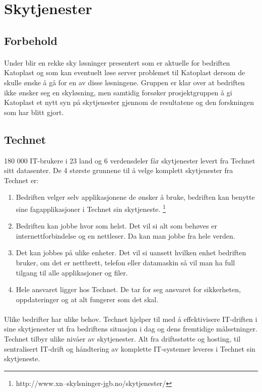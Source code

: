 \section{Skytjenester}
\subsection{Forbehold} 
\paragraph{} Under blir en rekke sky løsninger presentert som er aktuelle for bedriften Katoplast og som kan eventuelt løse server problemet til Katoplast dersom de skulle ønske å gå for en av disse løsningene. Gruppen er klar over at bedriften ikke ønsker seg en skyløsning, men samtidig forsøker prosjektgruppen å gi Katoplast et nytt syn på skytjenester gjennom de resultatene og den forskningen som har blitt gjort.
\subsection{Technet}
180 000 IT-brukere i 23 land og 6 verdensdeler får skytjenester levert fra Technet sitt datasenter. De 4 største grunnene til å velge komplett skytjenester fra Technet er: 
\begin{enumerate}[noitemsep]
\item Bedriften velger selv applikasjonene de ønsker å bruke, bedriften kan benytte sine fagapplikasjoner i Technet sin skytjeneste. 
\footnote{http://www.xn--skylsninger-jgb.no/skytjenester/}

\item Bedriften kan jobbe hvor som helst. Det vil si alt som behøves er internettforbindelse og en nettleser. Da kan man jobbe fra hele verden.

\item Det kan jobbes på ulike enheter. Det vil si uansett hvilken enhet bedriften bruker, om det er nettbrett, telefon eller datamaskin så vil man ha full tilgang til alle applikasjoner og filer.

\item Hele ansvaret ligger hos Technet. De tar for seg ansvaret for sikkerheten, oppdateringer og at alt fungerer som det skal. 
\end{enumerate}

\paragraph{} Ulike bedrifter har ulike behov. Technet hjelper til med å effektivisere IT-driften i sine skytjenester ut fra bedriftens situasjon i dag og dens fremtidige målsetninger. Technet tilbyr ulike nivåer av skytjenester. Alt fra driftsstøtte og hosting, til sentralisert IT-drift og håndtering av komplette IT-systemer leveres i Technet sin skytjeneste.


